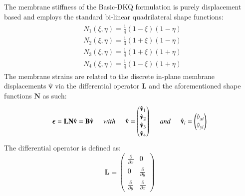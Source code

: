 The membrane stiffness of the Basic-DKQ formulation is purely displacement based and employs the standard bi-linear quadrilateral shape functions:
\begin{gather} 
\begin{aligned}
&N_1 (\xi , \eta) = \frac{1}{4} (1-\xi)(1-\eta)
\\
&N_2 (\xi , \eta) = \frac{1}{4} (1+\xi)(1-\eta)
\\
&N_3 (\xi , \eta) = \frac{1}{4} (1+\xi)(1+\eta)
\\
&N_4 (\xi , \eta) = \frac{1}{4} (1-\xi)(1+\eta)
\label{eqApp1_1}
\end{aligned}
\end{gather}
The membrane strains are related to the discrete in-plane membrane displacements $\hat{\mathbf{v}}$ via the differential operator $\mathbf{L}$ and the aforementioned shape functions $\mathbf{N}$ as such:
\begin{equation}
\boldsymbol{\epsilon} = \mathbf{L} \mathbf{N} \hat{\mathbf{v}} = \mathbf{B}  \hat{\mathbf{v}} 
\hspace{5mm}
with
\hspace{5mm}
\hat{\mathbf{v}} = \begin{pmatrix}
\hat{\mathbf{v}}_1 \\
\hat{\mathbf{v}}_2 \\
\hat{\mathbf{v}}_3 \\
\hat{\mathbf{v}}_4 \\
\end{pmatrix}
\hspace{5mm}
and
\hspace{5mm}
\hat{\mathbf{v}}_i = \begin{pmatrix}
\hat{{v}}_{xi} \\
\hat{{v}}_{yi}
\end{pmatrix}
\label{eqApp1_2}
\end{equation}
The differential operator is defined as:
\begin{equation}
\mathbf{L} = \begin{pmatrix}
\frac{\partial}{\partial x} & 0 \\
0 & \frac{\partial}{\partial y}\\
\frac{\partial}{\partial y} & \frac{\partial}{\partial x}
\end{pmatrix}
\label{eqApp1_3}
\end{equation}


